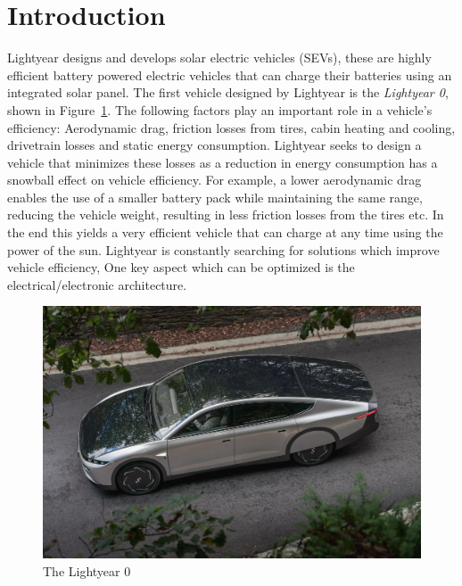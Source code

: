 \section{Introduction}
\label{sec:introduction}
Lightyear designs and develops solar electric vehicles (SEVs), these are highly efficient battery powered electric vehicles that can charge their batteries using an integrated solar panel. The first vehicle designed by Lightyear is the \textit{Lightyear 0}, shown in Figure~\ref{fig:zero}. The following factors play an important role in a vehicle's efficiency: Aerodynamic drag, friction losses from tires, cabin heating and cooling, drivetrain losses and static energy consumption. Lightyear seeks to design a vehicle that minimizes these losses as a reduction in energy consumption has a snowball effect on vehicle efficiency. For example, a lower aerodynamic drag enables the use of a smaller battery pack while maintaining the same range, reducing the vehicle weight, resulting in less friction losses from the tires etc. In the end this yields a very efficient vehicle that can charge at any time using the power of the sun. Lightyear is constantly searching for solutions which improve vehicle efficiency, One key aspect which can be optimized is the electrical/electronic architecture.

\begin{figure}[htb]
    \centering
    \includegraphics[width=\textwidth]{images/Lightyear_zero.jpg}
    \caption{The Lightyear 0}
    \label{fig:zero}
\end{figure}

